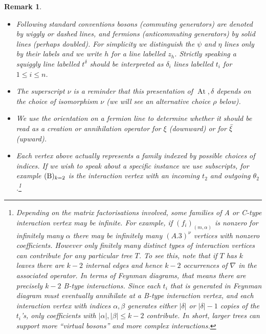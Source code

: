 \documentclass[english,letter paper,12pt,leqno]{article}
\theoremstyle{example}
\newtheorem{remark}[theorem]{Remark}
\numberwithin{equation}{section}
\def\BB{\mathcal{B}}
\def\HH{\HH}
\def\HH{\mathcal{H}}
\DeclareMathOperator{\At}{At}
\begin{document}
\begin{remark}
\begin{itemize}
\item Following standard conventions bosons (commuting generators) are denoted by wiggly or dashed lines, and fermions (anticommuting generators) by solid lines \cite[\S 4.7]{ps} (perhaps doubled). For simplicity we distinguish the $\psi$ and $\eta$ lines only by their labels and we write $h$ for a line labelled $z_h$. Strictly speaking a squiggly line labelled $t^\delta$ should be interpreted as $\delta_i$ lines labelled $t_i$ for $1 \le i \le n$.

\item The superscript $\nu$ is a reminder that this presentation of $\At, \delta$ depends on the choice of isomorphism $\nu$ (we will see an alternative choice $\rho$ below).
\item We use the orientation on a fermion line to determine whether it should be read as a creation or annihilation operator for $\xi$ (downward) or for $\Bar{\xi}$ (upward).
\item Each vertex above actually represents a family indexed by possible choices of indices. If we wish to speak about a specific instance we use subscripts, for example $(\textup{B})_{k=2}$ is the interaction vertex with an incoming $t_2$ and outgoing $\theta_2$.\footnote{Depending on the matrix factorisations involved, some families of A or C-type interaction vertex may be \emph{infinite}. For example, if $(f_i)_{(m, \alpha)}$ is nonzero for infinitely many $\alpha$ there may be infinitely many $(A.3)^{\nu}$ vertices with nonzero coefficients. However only finitely many distinct types of interaction vertices can contribute for any particular tree $T$. To see this, note that if $T$ has $k$ leaves there are $k - 2$ internal edges and hence $k - 2$ occurrences of $\nabla$ in the associated operator. In terms of Feynman diagrams, that means there are precisely $k - 2$ B-type interactions. Since each $t_i$ that is generated in Feynman diagram must eventually annihilate at a B-type interaction vertex, and each interaction vertex with indices $\alpha, \beta$ generates either $|\delta|$ or $|\delta| - 1$ copies of the $t_i$'s, only coefficients with $|\alpha|, |\beta| \le k - 2$ contribute. In short, larger trees can support more ``virtual bosons'' and more complex interactions.}
\end{itemize}
\end{remark}
\end{document}
